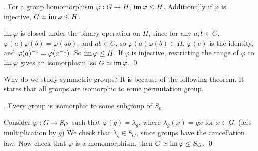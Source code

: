 \lemma. For a group homomorphism \(\varphi: G \rightarrow H\), \(\operatorname{im} \varphi \leq H\). Additionally if \(\varphi\) is injective, \(G \simeq \operatorname{im} \varphi \leq H\).

\pf \(\operatorname{im}\varphi\) is closed under the binary operation on \(H\), since for any \(a, b \in G\), \(\varphi(a)\varphi(b) = \varphi(ab)\), and \(ab \in G\), so \(\varphi(a)\varphi(b) \in H\). \(\varphi(e)\) is the identity, and \(\varphi(a)^{-1} = \varphi(a^{-1})\). So \(\operatorname{im}\varphi \leq H\). If \(\varphi\) is injective, restricting the range of \(\varphi\) to \(\operatorname{im} \varphi\) gives an isomorphism, so \(G \simeq \operatorname{im} \varphi\). \qed

Why do we study symmetric groups? It is because of the following theorem. It states that all groups are isomorphic to some permutation group.

\thm.  Every group is isomorphic to some subgroup of \(S_n\).

\pf Consider \(\varphi : G \rightarrow S_G\) such that \(\varphi(g) = \lambda_g\), where \(\lambda_g(x) = gx\) for \(x \in G\). (left multiplication by \(g\)) We check that \(\lambda_g \in S_G\), since groups have the cancellation law. Now check that \(\varphi\) is a monomorphism, then \(G \simeq \operatorname{im} \varphi \leq S_G\). \qed

\pagebreak
